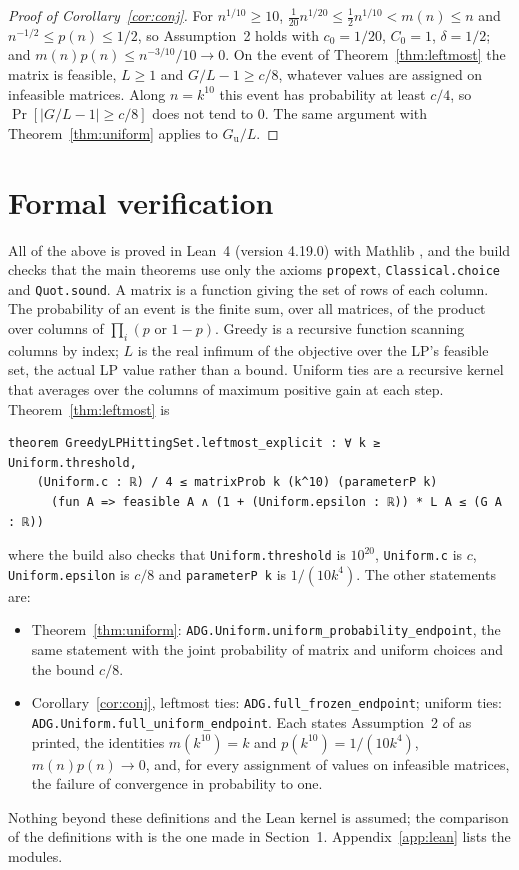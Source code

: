 \documentclass[11pt]{article}
\theoremstyle{remark}
\newcommand{\Gu}{G_{\mathrm u}}
\begin{document}
\begin{proof}[Proof of Corollary~\ref{cor:conj}]
For $n^{1/10}\ge10$, $\tfrac1{20}n^{1/20}\le\tfrac12n^{1/10}<m(n)\le n$
and $n^{-1/2}\le p(n)\le1/2$, so Assumption~2 holds with $c_0=1/20$, $C_0=1$,
$\delta=1/2$; and $m(n)p(n)\le n^{-3/10}/10\to0$. On the event of
Theorem~\ref{thm:leftmost} the matrix is feasible, $L\ge1$ and
$G/L-1\ge c/8$, whatever values are assigned on infeasible matrices. Along
$n=k^{10}$ this event has probability at least $c/4$, so
$\Pr[|G/L-1|\ge c/8]$ does not tend to $0$. The same argument with
Theorem~\ref{thm:uniform} applies to $\Gu/L$.
\end{proof}

\section{Formal verification}\label{sec:lean}

All of the above is proved in Lean~4 \cite{Lean4} (version 4.19.0) with
Mathlib \cite{Mathlib}, and
the build checks that the main theorems use only the axioms
\texttt{propext}, \texttt{Classical.choice} and \texttt{Quot.sound}. A
matrix is a function giving the set of rows of each column. The
probability of an event is the finite sum, over all matrices, of the
product over columns of $\prod_i(p\text{ or }1-p)$. Greedy is a recursive
function scanning columns by index; $L$ is the real infimum of the
objective over the LP's feasible set, the actual LP value rather than a
bound. Uniform ties are a recursive kernel that averages over the columns
of maximum positive gain at each step. Theorem~\ref{thm:leftmost} is
{\small
\begin{verbatim}
theorem GreedyLPHittingSet.leftmost_explicit : ∀ k ≥ Uniform.threshold,
    (Uniform.c : ℝ) / 4 ≤ matrixProb k (k^10) (parameterP k)
      (fun A => feasible A ∧ (1 + (Uniform.epsilon : ℝ)) * L A ≤ (G A : ℝ))
\end{verbatim}
}
\noindent where the build also checks that \texttt{Uniform.threshold} is
$10^{20}$, \texttt{Uniform.c} is $c$, \texttt{Uniform.epsilon} is $c/8$ and
\texttt{parameterP k} is $1/(10k^4)$. The other statements are:
{\raggedright
\begin{itemize}
\item Theorem~\ref{thm:uniform}:
\texttt{ADG.Uniform.uniform\_probability\_endpoint}, the same statement
with the joint probability of matrix and uniform choices and the bound
$c/8$.
\item Corollary~\ref{cor:conj}, leftmost ties:
\texttt{ADG.full\_frozen\_endpoint}; uniform ties:
\texttt{ADG.Uniform.full\_uniform\_endpoint}. Each states Assumption~2 of
\cite{ADG} as printed, the identities $m(k^{10})=k$ and
$p(k^{10})=1/(10k^4)$, $m(n)p(n)\to0$, and, for every assignment of values
on infeasible matrices, the failure of convergence in probability to one.
\end{itemize}
\par}
Nothing beyond these definitions and the Lean kernel is assumed; the
comparison of the definitions with \cite{ADG} is the one made in
Section~1. Appendix~\ref{app:lean} lists the modules.
\end{document}
